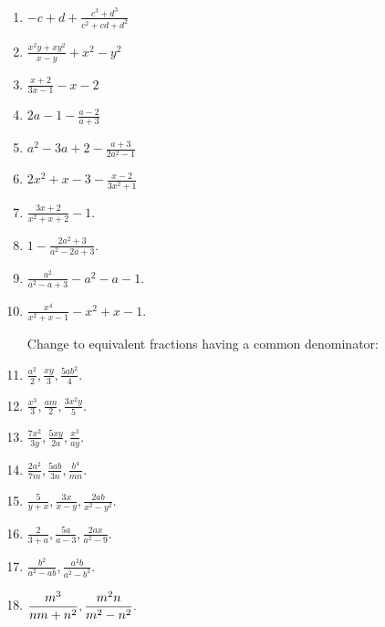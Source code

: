 \documentclass{book}
\begin{document}
\begin{enumerate}
\item $\displaystyle -c + d + \frac{c^3 + d^3}{c^2 + cd + d^2}$

\item $\displaystyle \frac{x^2y + xy^2}{x - y} + x^2 - y^2$

\item $\displaystyle \frac{x+2}{3x - 1} - x - 2$

\item $\displaystyle 2a - 1 - \frac{a-2}{a+3}$

\item $\displaystyle a^2 - 3a + 2 - \frac{a + 3}{2a^2 - 1}$

\item $\displaystyle 2 x^2 + x - 3 - \frac{x - 2}{3 x^2 + 1}$

\item $\displaystyle \frac{3x + 2}{x^2 + x + 2} - 1$.

\item $\displaystyle 1 - \frac{2a^2 + 3}{a^2 - 2a + 3}$.

\item $\displaystyle \frac{a^2}{a^2 - a + 3} - a^2 - a - 1$.

\item $\displaystyle \frac{x^4}{x^2 + x - 1} - x^2 + x - 1$.

Change to equivalent fractions having a common
denominator:

\item $\displaystyle \frac{a^2}{2}, \frac{xy}{3},
\frac{5ab^2}{4}.$

\item $\displaystyle \frac{x^3}{3}, \frac{am}{2},
\frac{3x^2y}{5}.$

\item $\displaystyle \frac{7x^2}{3y}, \frac{5xy}{2a},
\frac{x^3}{ay}.$

\item $\displaystyle \frac{2a^2}{7m}, \frac{5ab}{3n},
\frac{b^4}{mn}.$

\item $\displaystyle \frac{5}{y+x}, \frac{3x}{x-y},
\frac{2ab}{x^2-y^2}.$

\item $\displaystyle \frac{2}{3+a}, \frac{5a}{a-3},
\frac{2ax}{a^2-9}.$

\item $\displaystyle \frac{b^2}{a^2-ab}, \frac{a^2b}{a^2-b^2}.$

\item $\displaystyle \displaystyle \frac{m^3}{nm+n^2},
\frac{m^2n}{m^2-n^2}.$


\end{enumerate}
\end{document}
